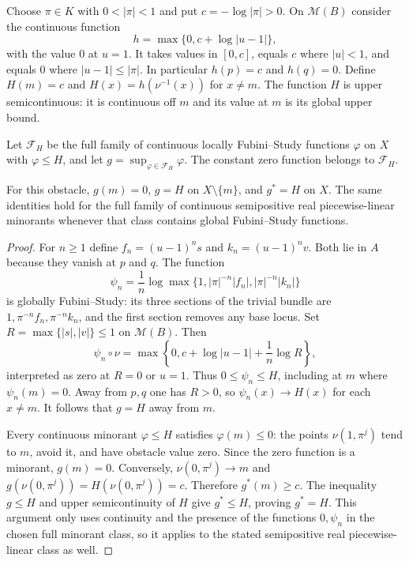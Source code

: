 Choose $\pi\in K$ with $0<|\pi|<1$ and put $c=-\log|\pi|>0$. On $\mathcal M(B)$ consider the continuous function
\[
 h=\max\{0,c+\log|u-1|\},
\]
with the value $0$ at $u=1$. It takes values in $[0,c]$, equals $c$ where $|u|<1$, and equals $0$ where $|u-1|\leq|\pi|$. In particular $h(p)=c$ and $h(q)=0$. Define $H(m)=c$ and $H(x)=h(\nu^{-1}(x))$ for $x\neq m$. The function $H$ is upper semicontinuous: it is continuous off $m$ and its value at $m$ is its global upper bound.

Let $\mathcal F_H$ be the full family of continuous locally Fubini--Study functions $\varphi$ on $X$ with $\varphi\leq H$, and let $g=\sup_{\varphi\in\mathcal F_H}\varphi$. The constant zero function belongs to $\mathcal F_H$.

\begin{proposition}\label{prop:supplied-p031-envelope-identity}
For this obstacle, $g(m)=0$, $g=H$ on $X\setminus\{m\}$, and $g^*=H$ on $X$. The same identities hold for the full family of continuous semipositive real piecewise-linear minorants whenever that class contains global Fubini--Study functions.
\end{proposition}

\begin{proof}
For $n\geq1$ define $f_n=(u-1)^n s$ and $k_n=(u-1)^n v$. Both lie in $A$ because they vanish at $p$ and $q$. The function
\begin{equation}\label{eq:supplied-p031-fs-minorants}
 \psi_n=\frac1n\log\max\bigl\{1,|\pi|^{-n}|f_n|,|\pi|^{-n}|k_n|\bigr\}
\end{equation}
is globally Fubini--Study: its three sections of the trivial bundle are $1,\pi^{-n}f_n,\pi^{-n}k_n$, and the first section removes any base locus. Set $R=\max\{|s|,|v|\}\leq1$ on $\mathcal M(B)$. Then
\[
 \psi_n\circ\nu=\max\left\{0,c+\log|u-1|+\frac1n\log R\right\},
\]
interpreted as zero at $R=0$ or $u=1$. Thus $0\leq\psi_n\leq H$, including at $m$ where $\psi_n(m)=0$. Away from $p,q$ one has $R>0$, so $\psi_n(x)\to H(x)$ for each $x\neq m$. It follows that $g=H$ away from $m$.

Every continuous minorant $\varphi\leq H$ satisfies $\varphi(m)\leq0$: the points $\nu(1,\pi^j)$ tend to $m$, avoid it, and have obstacle value zero. Since the zero function is a minorant, $g(m)=0$. Conversely, $\nu(0,\pi^j)\to m$ and $g(\nu(0,\pi^j))=H(\nu(0,\pi^j))=c$. Therefore $g^*(m)\geq c$. The inequality $g\leq H$ and upper semicontinuity of $H$ give $g^*\leq H$, proving $g^*=H$. This argument only uses continuity and the presence of the functions $0,\psi_n$ in the chosen full minorant class, so it applies to the stated semipositive real piecewise-linear class as well.
\end{proof}


